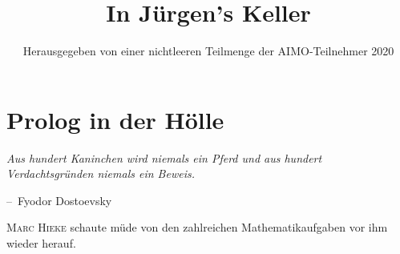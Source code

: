 \documentclass[oneside]{memoir}
\title{In Jürgen's Keller}
\author{Herausgegeben von einer nichtleeren Teilmenge der AIMO-Teilnehmer 2020}
\makeatletter
\newenvironment{chapquote}[2][2em]
  {\setlength{\@tempdima}{#1}%
   \def\chapquote@author{#2}%
   \parshape 1 \@tempdima \dimexpr\textwidth-2\@tempdima\relax%
   \itshape}
  {\par\normalfont\hfill--\ \chapquote@author\hspace*{\@tempdima}\par\bigskip}
\makeatother
\begin{document}
\begin{titlingpage}
\maketitle
\end{titlingpage}
\chapter{Prolog in der Hölle}

\begin{chapquote}{Fyodor Dostoevsky}
\glqq Aus hundert Kaninchen wird niemals ein Pferd und aus hundert Verdachtsgründen niemals ein Beweis.\grqq
\end{chapquote}

\lettrine{M}{arc Hieke} schaute müde von den zahlreichen Mathematikaufgaben vor ihm wieder herauf.
\end{document}
